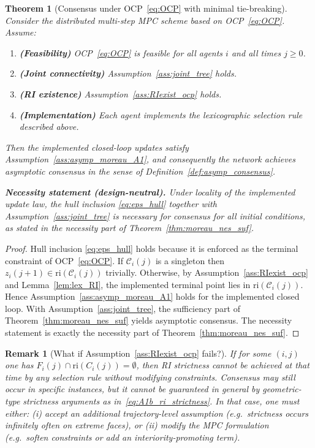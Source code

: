 \documentclass[12pt,draftcls,onecolumn]{IEEEtran}
\newtheorem{theorem}{Theorem}
\newtheorem{remark}{Remark}
\def\Cij{\mathcal{C}_i (j)}
\def\ri{\mathrm{ri}}
\begin{document}
\begin{theorem}[Consensus under OCP~\eqref{eq:OCP} with minimal tie-breaking]\label{thm:consensus_ocp_lex}
Consider the distributed multi-step MPC scheme based on OCP~\eqref{eq:OCP}. Assume:
\begin{enumerate}
\item \textbf{(Feasibility)} OCP~\eqref{eq:OCP} is feasible for all agents $i$ and all times $j\ge0$.
\item \textbf{(Joint connectivity)} Assumption~\ref{ass:joint_tree} holds.
\item \textbf{(RI existence)} Assumption~\ref{ass:RIexist_ocp} holds.
\item \textbf{(Implementation)} Each agent implements the lexicographic selection rule described above.
\end{enumerate}
Then the implemented closed-loop updates satisfy Assumption~\ref{ass:asymp_moreau_A1}, and consequently the
network achieves asymptotic consensus in the sense of Definition~\ref{def:asymp_consensus}.

\smallskip
\noindent\textbf{Necessity statement (design-neutral).}
Under locality of the implemented update law, the hull inclusion \eqref{eq:eps_hull} together with
Assumption~\ref{ass:joint_tree} is necessary for consensus for all initial conditions, as stated in the
necessity part of Theorem~\ref{thm:moreau_nes_suf}.
\end{theorem}

\begin{proof}
Hull inclusion \eqref{eq:eps_hull} holds because it is enforced as the terminal constraint of OCP~\eqref{eq:OCP}.
If $\Cij$ is a singleton then $z_i(j+1)\in \ri(\Cij)$ trivially. Otherwise, by
Assumption~\ref{ass:RIexist_ocp} and Lemma~\ref{lem:lex_RI}, the implemented terminal point lies in
$\ri(\Cij)$. Hence Assumption~\ref{ass:asymp_moreau_A1} holds for the implemented closed loop.
With Assumption~\ref{ass:joint_tree}, the sufficiency part of Theorem~\ref{thm:moreau_nes_suf} yields asymptotic
consensus.
The necessity statement is exactly the necessity part of Theorem~\ref{thm:moreau_nes_suf}.
\end{proof}

\begin{remark}[What if Assumption~\ref{ass:RIexist_ocp} fails?]\label{rem:if_RIexist_fails}
If for some $(i,j)$ one has $F_i(j)\cap \ri(C_i(j))=\emptyset$, then RI strictness cannot be achieved at
that time by any selection rule without modifying constraints. Consensus may still occur in specific
instances, but it cannot be guaranteed in general by geometric-type strictness arguments as in~\eqref{eq:A1b_ri_strictness}.
In that case, one must either:
(i) accept an additional trajectory-level assumption (e.g.\ strictness occurs infinitely often on extreme
faces), or (ii) modify the MPC formulation (e.g.\ soften constraints or add an interiority-promoting term).
\end{remark}
\end{document}
